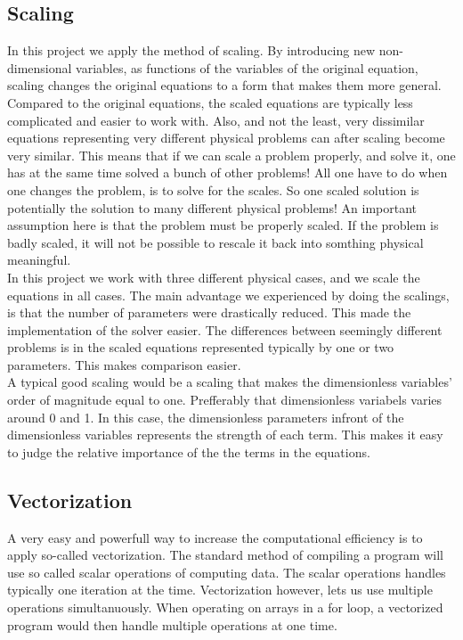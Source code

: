\documentclass{article}
\begin{document}
\subsection{Scaling}
In this project we apply the method of scaling. By introducing new non-dimensional variables, as functions of the variables of the original equation, scaling changes the original equations to a form that makes them more general. Compared to the original equations, the scaled equations are typically less complicated and easier to work with. Also, and not the least, very dissimilar equations representing very different physical problems can after scaling become very similar. This means that if we can scale a problem properly, and solve it, one has at the same time solved a bunch of other problems! All one have to do when one changes the problem, is to solve for the scales. So one scaled solution is potentially the solution to many different physical problems! An important assumption here is that the problem must be properly scaled. If the problem is badly scaled, it will not be possible to rescale it back into somthing physical meaningful.\\

In this project we work with three different physical cases, and we scale the equations in all cases. The main advantage we experienced by doing the scalings, is that the number of parameters were drastically reduced. This made the implementation of the solver easier. The differences between seemingly different problems is in the scaled equations represented typically by one or two parameters. This makes comparison easier.\\

A typical good scaling would be a scaling that makes the dimensionless variables' order of magnitude equal to one. Prefferably that dimensionless variabels varies around 0 and 1. In this case, the dimensionless parameters infront of the dimensionless variables represents the strength of each term. This makes it easy to judge the relative importance of the the terms in the equations. 

\subsection{Vectorization}
A very easy and powerfull way to increase the computational efficiency is to apply so-called vectorization. The standard method of compiling a program will use so called scalar operations of computing data. The scalar operations handles typically one iteration at the time. Vectorization however, lets us use multiple operations simultanuously. When operating on arrays in a for loop, a vectorized program would then handle multiple operations at one time. \\
\end{document}
